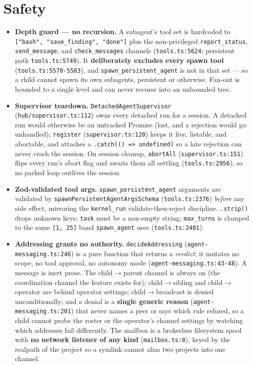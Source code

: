 \documentclass[11pt]{article}
\begin{document}
\section{Safety}

\begin{itemize}[leftmargin=*]
  \item \textbf{Depth guard --- no recursion.} A subagent's tool set is hardcoded
  to \texttt{["bash", "save\_finding", "done"]} plus the non-privileged
  \texttt{report\_status}, \texttt{send\_message}, and \texttt{check\_messages}
  channels (\texttt{tools.ts:5624}; persistent path \texttt{tools.ts:5749}). It
  \textbf{deliberately excludes every spawn tool} (\texttt{tools.ts:5570-5583}),
  and \texttt{spawn\_persistent\_agent} is not in that set --- so a child cannot
  spawn its own subagents, persistent or otherwise. Fan-out is bounded to a single
  level and can never recurse into an unbounded tree.
  \item \textbf{Supervisor teardown.} \texttt{DetachedAgentSupervisor}
  (\texttt{hub/supervisor.ts:112}) owns every detached run for a session. A
  detached run would otherwise be an untracked Promise (lost, and a rejection would
  go unhandled); \texttt{register} (\texttt{supervisor.ts:120}) keeps it live,
  listable, and abortable, and attaches a \texttt{.catch(() => undefined)} so a
  late rejection can never crash the session. On session cleanup, \texttt{abortAll}
  (\texttt{supervisor.ts:151}) flips every run's abort flag and awaits them all
  settling (\texttt{tools.ts:2956}), so no parked loop outlives the session.
  \item \textbf{Zod-validated tool args.} \texttt{spawn\_persistent\_agent}
  arguments are validated by \texttt{spawnPersistentAgentArgsSchema}
  (\texttt{tools.ts:2376}) \textit{before} any side effect, mirroring the
  \texttt{kernel\_run} validate-then-reject discipline. \texttt{.strip()} drops
  unknown keys; \texttt{task} must be a non-empty string; \texttt{max\_turns} is
  clamped to the same \texttt{[1, 25]} band \texttt{spawn\_agent} uses
  (\texttt{tools.ts:2401}).
  \item \textbf{Addressing grants no authority.} \texttt{decideAddressing}
  (\texttt{agent-messaging.ts:246}) is a pure function that returns a
  \textit{verdict}; it mutates no scope, no tool approval, no autonomy mode
  (\texttt{agent-messaging.ts:43-48}). A message is inert prose. The
  child$\rightarrow$parent channel is always on (the coordination channel the
  feature exists for); child$\rightarrow$sibling and child$\rightarrow$operator are
  behind operator settings; child$\rightarrow$broadcast is denied unconditionally;
  and a denial is a \textbf{single generic reason} (\texttt{agent-messaging.ts:201})
  that never names a peer or says which rule refused, so a child cannot probe the
  roster or the operator's channel settings by watching which addresses fail
  differently. The mailbox is a brokerless filesystem spool with \textbf{no
  network listener of any kind} (\texttt{mailbox.ts:8}), keyed by the realpath of
  the project so a symlink cannot alias two projects into one channel.
\end{itemize}
\end{document}
